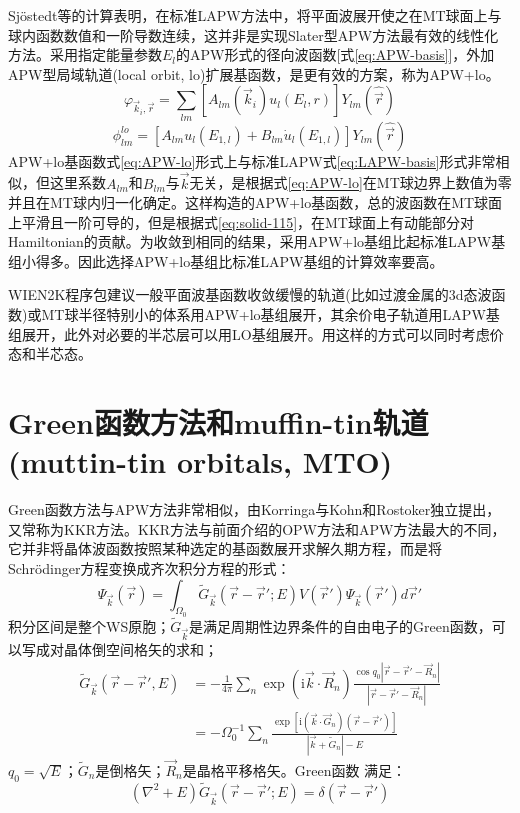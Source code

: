 Sj\"ostedt等\cite{SSC114-15_2000}的计算表明，在标准LAPW方法中，将平面波展开使之在MT球面上与球内函数数值和一阶导数连续，这并非是实现Slater型APW方法最有效的线性化方法。采用指定能量参数$E_l$的APW形式的径向波函数[式\eqref{eq:APW-basis}]，外加APW型局域轨道(local orbit, lo)扩展基函数，是更有效的方案，称为APW+lo。
\begin{equation}
  \varphi_{\vec k_i,\vec r}=\sum_{lm}[A_{lm}(\vec k_i)u_l(E_l,r)]Y_{lm}(\hat{\vec r})
  \label{eq:APW-basis}
\end{equation}
\begin{equation}
  \phi_{lm}^{lo}=[A_{lm}u_l(E_{1,l})+B_{lm}\dot u_l(E_{1,l})]Y_{lm}(\hat{\vec r})
  \label{eq:APW-lo}
\end{equation}
APW+lo基函数式\eqref{eq:APW-lo}形式上与标准LAPW式\eqref{eq:LAPW-basis}形式非常相似，但这里系数$A_{lm}$和$B_{lm}$与$\vec k$无关，是根据式\eqref{eq:APW-lo}在MT球边界上数值为零并且在MT球内归一化确定。这样构造的APW+lo基函数，总的波函数在MT球面上平滑且一阶可导的，但是根据式\eqref{eq:solid-115}，在MT球面上有动能部分对Hamiltonian的贡献。为收敛到相同的结果，采用APW+lo基组比起标准LAPW基组小得多\cite{PRB64-195134_2001}。因此选择APW+lo基组比标准LAPW基组的计算效率要高。

WIEN2K程序包建议\cite{CPC59-399_1990,WIEN2K-UG_2001,CPC147-71_2002}一般平面波基函数收敛缓慢的轨道(比如过渡金属的3d态波函数)或MT球半径特别小的体系用APW+lo基组展开，其余价电子轨道用LAPW基组展开，此外对必要的半芯层可以用LO基组展开。用这样的方式可以同时考虑价态和半芯态。

\section{Green函数方法和muffin-tin轨道(muttin-tin orbitals, MTO)}
Green函数方法与APW方法非常相似，由Korringa\cite{P13-392_1947}与Kohn和Rostoker\cite{PR94-1111_1954}独立提出，又常称为KKR方法。KKR方法与前面介绍的OPW方法和APW方法最大的不同，它并非将晶体波函数按照某种选定的基函数展开求解久期方程，而是将Schr\"odinger方程变换成齐次积分方程的形式\cite{Ziman,Lizhengzhong}：
\begin{equation}
  \Psi_{\vec k}(\vec r)=\int_{\Omega_0}\tilde G_{\vec k}(\vec r-\vec r';E)V(\vec r')\Psi_{\vec k}(\vec r')d\vec r'
  \label{eq:solid-116}
\end{equation}
积分区间是整个WS原胞；$\tilde G_{\vec k}$是满足周期性边界条件的自由电子的Green函数，可以写成对晶体倒空间格矢的求和；
\begin{equation}
  \begin{split}
	  \tilde G_{\vec k}(\vec r-\vec r',E)&=-\frac1{4\pi}\sum_n\exp(\mathrm{i}\vec k\cdot\vec R_n)\frac{\cos q_0|\vec r-\vec r'-\vec R_n|}{|\vec r-\vec r'-\vec R_n|}\\
	  &=-\Omega_0^{-1}\sum_n\frac{\exp[\mathrm{i}(\vec k\cdot\vec G_n)(\vec r-\vec r')]}{|\vec k+\tilde G_n|-E}
  \end{split}
  \label{eq:solid-117}
\end{equation}
$q_0=\sqrt E$；$\tilde G_n$是倒格矢；$\vec R_n$是晶格平移格矢。Green函数
满足：
\begin{equation}
  (\nabla^2+E)\tilde G_{\vec k}(\vec r-\vec r';E)=\delta(\vec r-\vec r')
  \label{eq:solid-118}
\end{equation}

